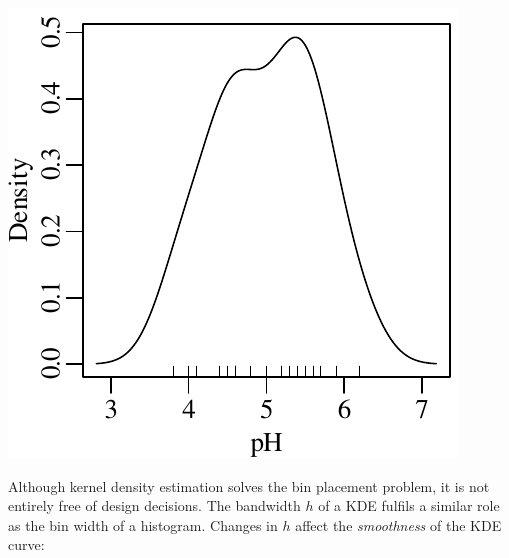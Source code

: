 \noindent\begin{minipage}[t][][b]{.3\textwidth}
  \includegraphics[width=\textwidth]{../figures/pHgaussKDE.pdf}\medskip
\end{minipage}
\begin{minipage}[t][][t]{.7\textwidth}
  \label{fig:pHgaussKDE}
\end{minipage}

Although kernel density estimation solves the bin placement problem,
it is not entirely free of design decisions. The bandwidth $h$ of a
KDE fulfils a similar role as the bin width of a histogram. Changes in
$h$ affect the \emph{smoothness} of the KDE curve:\medskip

